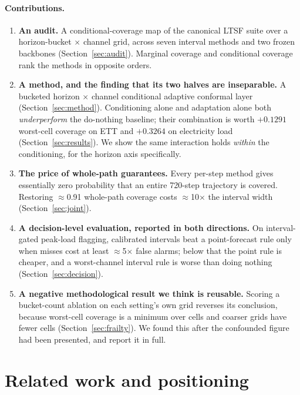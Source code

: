\documentclass[11pt]{article}
\begin{document}
\paragraph{Contributions.}
\begin{enumerate}\itemsep2pt
\item \textbf{An audit.} A conditional-coverage map of the canonical LTSF suite over a horizon-bucket $\times$ channel grid, across seven interval methods and two frozen backbones (Section~\ref{sec:audit}). Marginal coverage and conditional coverage rank the methods in opposite orders.
\item \textbf{A method, and the finding that its two halves are inseparable.} A bucketed horizon $\times$ channel conditional adaptive conformal layer (Section~\ref{sec:method}). Conditioning alone and adaptation alone both \emph{underperform} the do-nothing baseline; their combination is worth $+0.1291$ worst-cell coverage on ETT and $+0.3264$ on electricity load (Section~\ref{sec:results}). We show the same interaction holds \emph{within} the conditioning, for the horizon axis specifically.
\item \textbf{The price of whole-path guarantees.} Every per-step method gives essentially zero probability that an entire 720-step trajectory is covered. Restoring $\approx$0.91 whole-path coverage costs $\approx$10$\times$ the interval width (Section~\ref{sec:joint}).
\item \textbf{A decision-level evaluation, reported in both directions.} On interval-gated peak-load flagging, calibrated intervals beat a point-forecast rule only when misses cost at least $\approx$5$\times$ false alarms; below that the point rule is cheaper, and a worst-channel interval rule is worse than doing nothing (Section~\ref{sec:decision}).
\item \textbf{A negative methodological result we think is reusable.} Scoring a bucket-count ablation on each setting's own grid reverses its conclusion, because worst-cell coverage is a minimum over cells and coarser grids have fewer cells (Section~\ref{sec:frailty}). We found this after the confounded figure had been presented, and report it in full.
\end{enumerate}

\section{Related work and positioning}
\end{document}
